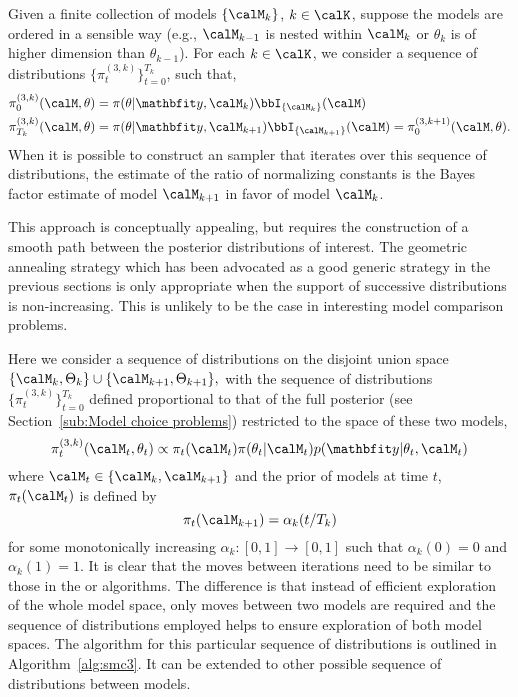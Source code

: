 Given a finite collection of models $\{\calM_k\}$, $k\in\calK$, suppose the
models are ordered in a sensible way (e.g., $\calM_{k-1}$ is nested within
$\calM_k$ or $\theta_k$ is of higher dimension than $\theta_{k-1}$). For each
$k\in\calK$, we consider a sequence of distributions
$\{\pi_t^{(3,k)}\}_{t=0}^{T_k}$, such that,
\begin{align*}
  \pi_0^{(3,k)}(\calM,\theta) &=
  \pi(\theta|\data,\calM_k) \bbI_{\{\calM_k\}}(\calM) \\
  \pi_{T_k}^{(3,k)}(\calM,\theta) &=
  \pi(\theta|\data,\calM_{k+1})
  \bbI_{\{\calM_{k+1}\}}(\calM) = \pi_{0}^{(3,k+1)}(\calM,\theta).
\end{align*}
When it is possible to construct an \smc sampler that iterates over this
sequence of distributions, the estimate of the ratio of normalizing constants
is the Bayes factor estimate of model $\calM_{k+1}$ in favor of model
$\calM_k$.

This approach is conceptually appealing, but requires the construction of a
smooth path between the posterior distributions of interest. The geometric
annealing strategy which has been advocated as a good generic strategy in the
previous sections is only appropriate when the support of successive
distributions is non-increasing. This is unlikely to be the case in
interesting model comparison problems.

Here we consider a sequence of distributions on the disjoint union space
$\{\calM_k,\Theta_k\}\cup\{\calM_{k+1},\Theta_{k+1}\},$ with the sequence of
distributions $\{\pi_t^{(3,k)}\}_{t=0}^{T_k}$ defined proportional to that of
the full posterior (see Section~\ref{sub:Model choice problems}) restricted to
the space of these two models,
\begin{equation}
  \pi_t^{(3,k)}(\calM_t,\theta_t) \propto
  \pi_t(\calM_t) \pi(\theta_t|\calM_t) p(\data|\theta_t,\calM_t)
\end{equation}
where $\calM_t\in\{\calM_k,\calM_{k+1}\}$ and the prior of models at time $t$,
$\pi_t(\calM_t)$ is defined by
\begin{equation}
  \pi_t(\calM_{k+1}) = \alpha_k(t/T_k)
  \label{eq:smc3_prior}
\end{equation}
for some monotonically increasing $\alpha_k:[0,1]\to[0,1]$ such that
$\alpha_k(0) = 0$ and $\alpha_k(1) = 1$. It is clear that the \mcmc moves
between iterations need to be similar to those in the \rjmcmc or \smc[1]
algorithms. The difference is that instead of efficient exploration of the
whole model space, only moves between two models are required and the sequence
of distributions employed helps to ensure exploration of both model spaces.
The algorithm for this particular sequence of distributions is outlined in
Algorithm~\ref{alg:smc3}. It can be extended to other possible sequence of
distributions between models.

